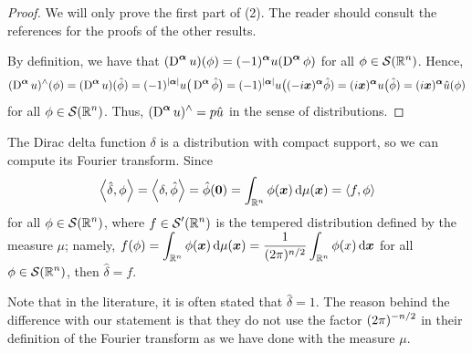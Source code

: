 \begin{proof}
We will only prove the first part of (2).  The reader should consult
the references for the proofs of the other results.

By definition, we have that
$\displaystyle (\operatorname{D}^{{\bm{\alpha}}} u)(\phi) = (-1)^{{\bm{\alpha}}}
u(\operatorname{D}^{{\bm{\alpha}}} \phi)$
for all $\displaystyle \phi \in \mathcal{S}(\mathbb{R}^n)$.  Hence,
\[
(\operatorname{D}^{{\bm{\alpha}}} u)^\wedge (\phi)
= (\operatorname{D}^{{\bm{\alpha}}} u)(\hat{\phi})
= (-1)^{|{\bm{\alpha}}|} u\big(\operatorname{D}^{{\bm{\alpha}}} \hat{\phi}\big)
= (-1)^{|{\bm{\alpha}}|} u\big((-i{\bm{x}})^{{\bm{\alpha}}} \hat{\phi})
= (i{\bm{x}})^{{\bm{\alpha}}} u\big( \hat{\phi})
= (i{\bm{x}})^{{\bm{\alpha}}} \hat{u}(\phi)
\]
for all $\displaystyle \phi \in \mathcal{S}(\mathbb{R}^n)$.  Thus,
$\displaystyle (\operatorname{D}^{{\bm{\alpha}}} u)^\wedge = p \hat{u}$ in the sense of
distributions.
\end{proof}

\begin{egg}
The Dirac delta function $\delta$ is a distribution with compact
support, so we can compute its Fourier transform.  Since
\[
\left\langle{\hat{\delta}} , {\phi}\right\rangle = \left\langle{\delta} , {\hat{\phi}}\right\rangle = \hat{\phi}({\bm{0}})
= \int_{\mathbb{R}^n} \phi({\bm{x}}) \,\mathrm{d}{\mu({\bm{x}})} =
\left\langle{f} , {\phi}\right\rangle
\]
for all $\displaystyle \phi \in \mathcal{S}(\mathbb{R}^n)$, where
$\displaystyle f \in \mathcal{S}'(\mathbb{R}^n)$ is the
tempered distribution defined by the measure $\mu$; namely,
$\displaystyle f(\phi) = \int_{\mathbb{R}^n} \phi({\bm{x}}) \,\mathrm{d}{\mu({\bm{x}})}
= \frac{1}{(2\pi)^{n/2}} \int_{\mathbb{R}^n} \phi(x) \,\mathrm{d}{{\bm{x}}}$ for all
$\displaystyle \phi \in \mathcal{S}(\mathbb{R}^n)$, then $\hat{\delta} = f$.

Note that in the literature, it is often stated that $\hat{\delta} = 1$.
The reason behind the difference with our statement is that they do
not use the factor $\displaystyle (2\pi)^{-n/2}$ in their definition
of the Fourier transform as we have done with the measure $\mu$.
\end{egg}

